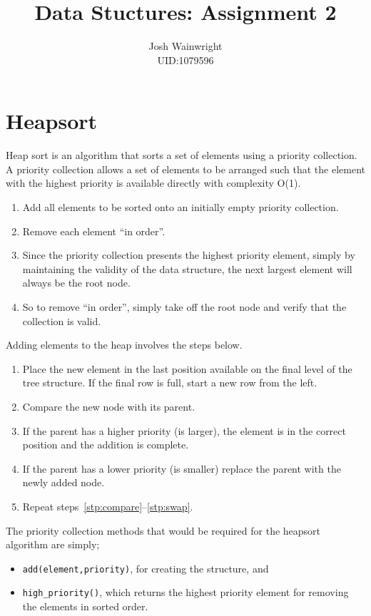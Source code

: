 \documentclass[11pt]{article} %
\author{Josh Wainwright \\ UID:1079596}
\title{Data Stuctures: Assignment 2 }
\date{}
\begin{document}
\maketitle

\section{Heapsort}

Heap sort is an algorithm that sorts a set of elements using a priority
collection.  A priority collection allows a set of elements to be arranged such
that the element with the highest priority is available directly with
complexity O(1).

\begin{enumerate}
	\item Add all elements to be sorted onto an initially empty priority
		collection.
	\item Remove each element ``in order''.
	\item Since the priority collection presents the highest priority element,
		simply by maintaining the validity of the data structure, the next
		largest element will always be the root node.
	\item So to remove ``in order'', simply take off the root node and verify
		that the collection is valid.
\end{enumerate}

Adding elements to the heap involves the steps below.
\begin{enumerate}
	\item Place the new element in the last position available on the final
		level of the tree structure. If the final row is full, start a new row
		from the left.
	\item Compare the new node with its parent. \label{stp:compare}
	\item If the parent has a higher priority (is larger), the element is in
		the correct position and the addition is complete.
	\item If the parent has a lower priority (is smaller) replace the parent
		with the newly added node. \label{stp:swap}
	\item Repeat steps~\ref{stp:compare}--\ref{stp:swap}.
\end{enumerate}

The priority collection methods that would be required for the heapsort
algorithm are simply;
\begin{itemize}
	\item \texttt{add(element,priority)}, for creating the structure, and
	\item \texttt{high\_priority()}, which returns the highest priority element
		for removing the elements in sorted order.
\end{itemize}
\end{document}
